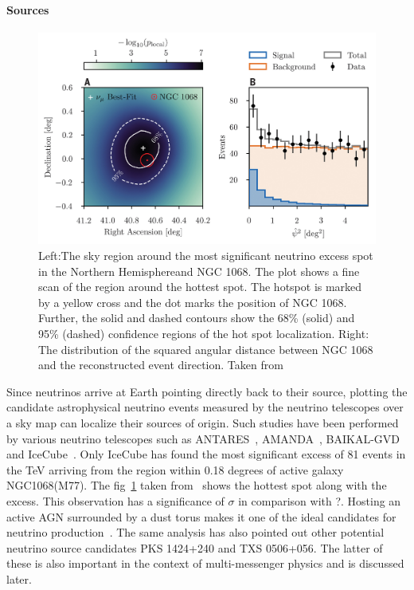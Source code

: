   \paragraph*{Sources}
  \label{subsubsec:Nusources}
  \begin{figure}[t!]
    \centering
    \includegraphics[width=14.5cm]{thesis_figures/CRnNu/science-abg3395-f2.jpg}
    \caption{Left:The sky region around the most significant neutrino excess spot in the Northern Hemisphereand NGC 1068. The plot shows a fine scan of the region around the hottest spot. The hotspot is marked by a yellow cross and the dot marks the position of NGC 1068. Further, 
    the solid and dashed contours show the 68\% (solid) and 95\% (dashed) confidence regions of
    the hot spot localization. Right: The distribution of the squared angular distance between NGC 1068 and the reconstructed event direction. Taken from~\cite{Icecube_2022}}
    \label{fig:NGC1068_excess}
  \end{figure}

  Since neutrinos arrive at Earth pointing directly back to their source, plotting the candidate astrophysical neutrino events measured by the neutrino telescopes over a sky map can localize their sources of origin. Such studies have been performed by various neutrino telescopes such as ANTARES~\cite{Albert_2021}, AMANDA~\cite{Abbasi_2009_Amanda}, BAIKAL-GVD~\cite{Allakhverdyan_2023} and IceCube~\cite{Icecube_2022}. Only IceCube has found the most significant excess of 81 events in the TeV arriving from the region within 0.18 degrees of active galaxy NGC1068(M77). The fig~\ref{fig:NGC1068_excess} taken from~\cite{Icecube_2022} shows the hottest spot along with the excess. This observation has a significance of $\sigma$ in comparison with ?. Hosting an active AGN surrounded by a dust torus makes it one of the ideal candidates for neutrino production~\cite{eichler1979high,berezinsky1981high}. The same analysis has also pointed out other potential neutrino source candidates PKS 1424+240 and TXS 0506+056. The latter of these is also important in the context of multi-messenger physics and is discussed later. 

